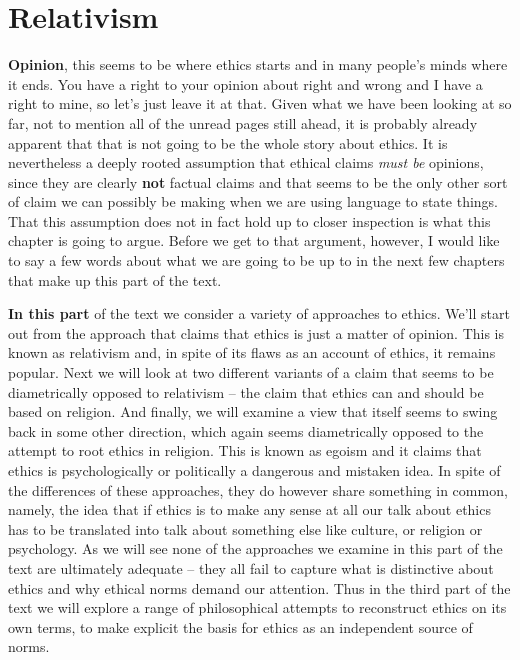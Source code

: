 \documentclass[]{book}
\begin{document}
\hypertarget{relativism}{%
\chapter{Relativism}\label{relativism}}

\textbf{Opinion}, this seems to be where ethics starts and in many people's minds where it ends. You have a right to your opinion about right and wrong and I have a right to mine, so let's just leave it at that. Given what we have been looking at so far, not to mention all of the unread pages still ahead, it is probably already apparent that that is not going to be the whole story about ethics. It is nevertheless a deeply rooted assumption that ethical claims \emph{must be} opinions, since they are clearly \textbf{not} factual claims and that seems to be the only other sort of claim we can possibly be making when we are using language to state things. That this assumption does not in fact hold up to closer inspection is what this chapter is going to argue. Before we get to that argument, however, I would like to say a few words about what we are going to be up to in the next few chapters that make up this part of the text.

\textbf{In this part} of the text we consider a variety of approaches to ethics. We'll start out from the approach that claims that ethics is just a matter of opinion. This is known as relativism and, in spite of its flaws as an account of ethics, it remains popular. Next we will look at two different variants of a claim that seems to be diametrically opposed to relativism -- the claim that ethics can and should be based on religion. And finally, we will examine a view that itself seems to swing back in some other direction, which again seems diametrically opposed to the attempt to root ethics in religion. This is known as egoism and it claims that ethics is psychologically or politically a dangerous and mistaken idea. In spite of the differences of these approaches, they do however share something in common, namely, the idea that if ethics is to make any sense at all our talk about ethics has to be translated into talk about something else like culture, or religion or psychology. As we will see none of the approaches we examine in this part of the text are ultimately adequate -- they all fail to capture what is distinctive about ethics and why ethical norms demand our attention. Thus in the third part of the text we will explore a range of philosophical attempts to reconstruct ethics on its own terms, to make explicit the basis for ethics as an independent source of norms.
\end{document}
